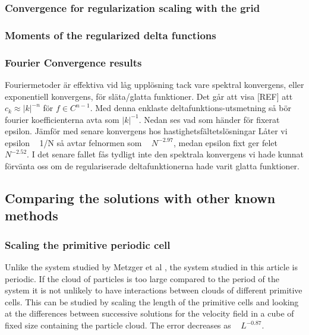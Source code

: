 \documentclass[a4paper,twoside=false,abstract=false,numbers=noenddot,
titlepage=false,headings=small,parskip=half,version=last]{scrartcl}
\begin{document}
\subsubsection{Convergence for regularization scaling with the grid}
\subsubsection{Moments of the regularized delta functions}
\subsubsection{Fourier Convergence results}
Fouriermetoder är effektiva vid låg upplösning tack vare spektral konvergens, eller exponentiell konvergens, för släta/glatta funktioner. Det går att visa [REF] att $c_k \approx |k|^{-n}$ för $f \in C^{n-1}$.
Med denna enklaste deltafunktions-utsmetning så bör fourier koefficienterna avta som $|k|^{-1}$.
Nedan ses vad som händer för fixerat epsilon. Jämför med senare 
konvergens hos hastighetsfältetslösningar
Låter vi epsilon ~ 1/N så avtar felnormen som ~ $N^{-2.97}$, medan epsilon fixt ger felet ~ $N^{-2.52}$. I det senare fallet fås tydligt inte den spektrala konvergens vi hade kunnat förvänta oss om de regulariserade deltafunktionerna hade varit glatta funktioner.
\subsection{Comparing the solutions with other known methods}
\subsubsection{Scaling the primitive periodic cell}\label{cellscale}
Unlike the system studied by Metzger et al \cite{fallingclouds}, the system studied in this article is periodic. If the cloud of particles is too large compared to the period of the system it is not unlikely to have interactions between clouds of different primitive cells. This can be studied by scaling the length of the primitive cells and looking at the differences between successive solutions for the velocity field in a cube of fixed size containing the particle cloud. The error decreases as ~ $L^{-0.87}$.
\end{document}
